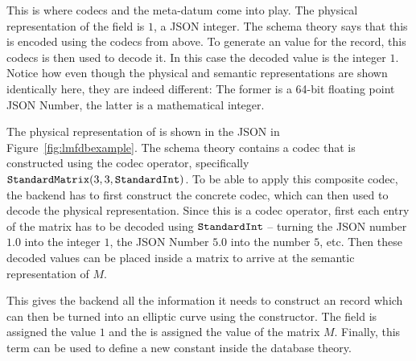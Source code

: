 This is where codecs and the  meta-datum come into play. 
The physical representation of the  field is $1$, a JSON integer. 
The schema theory says that this is encoded using the  codecs from above. 
To generate an \mmt value for the record, this codecs is then used to decode it. 
In this case the decoded value is the integer $1$. 
Notice how even though the physical and semantic representations are shown identically here, they are indeed different: The former is a 64-bit floating point JSON Number, the latter is a mathematical integer. 

The physical representation of  is shown in the JSON in Figure~\ref{fig:lmfdbexample}. 
The schema theory contains a codec that is constructed using the  codec operator, specifically $\plaintt{StandardMatrix}(3, 3, \plaintt{StandardInt})$. 
To be able to apply this composite codec, the backend has to first construct the concrete codec, which can then used to decode the physical representation. 
Since this is a codec operator, first each entry of the matrix has to be decoded using $\plaintt{StandardInt}$ -- turning the JSON number $1.0$ into the integer $1$, the JSON Number $5.0$ into the number $5$, etc. 
Then these decoded values can be placed inside a matrix to arrive at the semantic representation of $M$. 

This gives the backend all the information it needs to construct an \mmt record which can then be turned into an elliptic curve using the  constructor. 
The  field is assigned the value $1$ and the  is assigned the value of the matrix $M$. 
Finally, this \mmt term can be used to define a new constant inside the database theory.



